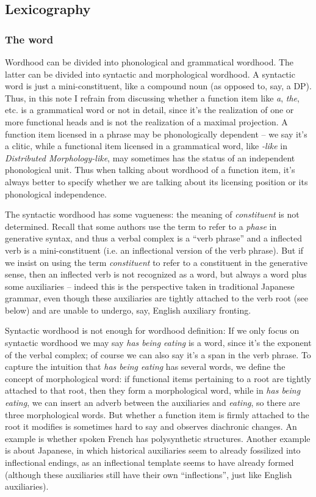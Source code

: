 \documentclass[UTF8, a4paper, oneside, scheme=plain, 12pt]{ctexbook}
\newcommand*{\term}[1]{\emph{#1}}
\newcommand{\form}[1]{\emph{#1}}
\begin{document}
{\subsection{Lexicography}

\subsubsection{The word}\label{sec:theory.word}

Wordhood can be divided into phonological and grammatical wordhood.
The latter can be divided into syntactic and morphological wordhood.
A syntactic word is just a mini-constituent,
like a compound noun (as opposed to, say, a DP).
Thus, in this note I refrain from discussing whether a function item 
like \form{a}, \form{the}, etc. 
is a grammatical word or not in detail,
since it's the realization of one or more functional heads
and is not the realization of a maximal projection.
A function item licensed in a phrase
may be phonologically dependent -- we say it's a clitic,
while a functional item licensed in a grammatical word, 
like \form{-like} in \form{Distributed Morphology-like},
may sometimes has the status of an independent phonological unit.
Thus when talking about wordhood of a function item,
it's always better to specify whether we are talking about its 
licensing position or its phonological independence.

The syntactic wordhood has some vagueness:
the meaning of \term{constituent} is not determined.
Recall that some authors use the term to refer to a \emph{phase} in generative syntax,
and thus a verbal complex is a ``verb phrase'' 
and a inflected verb is a mini-constituent (i.e. an inflectional version of the verb phrase).
But if we insist on using the term \term{constituent} 
to refer to a constituent in the generative sense, 
then an inflected verb is not recognized as a word, 
but always a word plus some auxiliaries -- 
indeed this is the perspective taken in traditional Japanese grammar,
even though these auxiliaries are tightly attached to the verb root (see below)
and are unable to undergo, say, English auxiliary fronting.

Syntactic wordhood is not enough for wordhood definition:
If we only focus on syntactic wordhood 
we may say \form{has being eating} is a word,
since it's the exponent of the verbal complex;
of course we can also say it's a span in the verb phrase.
To capture the intuition that \form{has being eating} has several words, 
we define the concept of morphological word:
if functional items pertaining to a root 
are tightly attached to that root, 
then they form a morphological word,
while in \form{has being eating},
we can insert an adverb between the auxiliaries and \form{eating},
so there are three morphological words.
But whether a function item is firmly attached to the root it modifies is sometimes hard to say 
and observes diachronic changes. 
An example is whether spoken French has polysynthetic structures.
Another example is about Japanese, 
in which historical auxiliaries seem to already fossilized into inflectional endings,
as an inflectional template seems to have already formed
(although these auxiliaries still have their own ``inflections'',
just like English auxiliaries).

}
\end{document}
